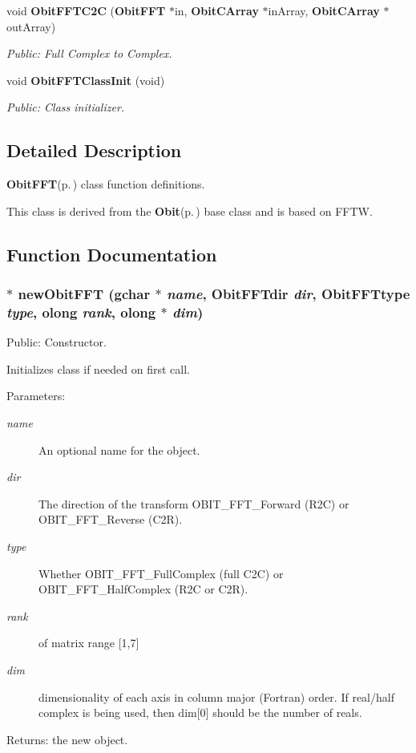 \begin{CompactItemize}
void {\bf Obit\-FFTC2C} ({\bf Obit\-FFT} $\ast$in, {\bf Obit\-CArray} $\ast$in\-Array, {\bf Obit\-CArray} $\ast$out\-Array)
\begin{CompactList}\small\item\em Public: Full Complex to Complex. \item\end{CompactList}\item 
void {\bf Obit\-FFTClass\-Init} (void)
\begin{CompactList}\small\item\em Public: Class initializer. \item\end{CompactList}\end{CompactItemize}


\subsection{Detailed Description}
{\bf Obit\-FFT}{\rm (p.\,\pageref{structObitFFT})} class function definitions. 

This class is derived from the {\bf Obit}{\rm (p.\,\pageref{structObit})} base class and is based on FFTW.

\subsection{Function Documentation}
\subsubsection{$\ast$ new\-Obit\-FFT (gchar $\ast$ {\em name}, Obit\-FFTdir {\em dir}, Obit\-FFTtype {\em type}, {\bf olong} {\em rank}, {\bf olong} $\ast$ {\em dim})}\label{ObitFFT_8c_a6}


Public: Constructor. 

Initializes class if needed on first call. \begin{Desc}
\item[Parameters:]
\begin{description}
\item[{\em name}]An optional name for the object. \item[{\em dir}]The direction of the transform OBIT\_\-FFT\_\-Forward (R2C) or OBIT\_\-FFT\_\-Reverse (C2R). \item[{\em type}]Whether OBIT\_\-FFT\_\-Full\-Complex (full C2C) or OBIT\_\-FFT\_\-Half\-Complex (R2C or C2R). \item[{\em rank}]of matrix range [1,7] \item[{\em dim}]dimensionality of each axis in column major (Fortran) order. If real/half complex is being used, then dim[0] should be the number of reals. \end{description}
\end{Desc}
\begin{Desc}
\item[Returns:]the new object. \end{Desc}
